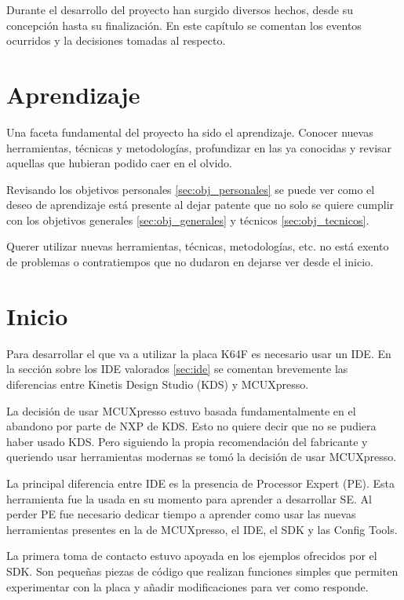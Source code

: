 {\label{ch:aspectos}}
Durante el desarrollo del proyecto han surgido diversos hechos, desde su
concepción hasta su finalización. En este capítulo se comentan los eventos
ocurridos y la decisiones tomadas al respecto.

\section{Aprendizaje}{\label{sec:aprendizaje}}
Una faceta fundamental del proyecto ha sido el aprendizaje. Conocer nuevas 
herramientas, técnicas y metodologías, profundizar en las ya conocidas y revisar
aquellas que hubieran podido caer en el olvido.

Revisando los objetivos personales \ref{sec:obj_personales} se puede ver como
el deseo de aprendizaje está presente al dejar patente que no solo se quiere
cumplir con los objetivos generales \ref{sec:obj_generales} y técnicos 
\ref{sec:obj_tecnicos}.

Querer utilizar nuevas herramientas, técnicas, metodologías, etc. no está exento
de problemas o contratiempos que no dudaron en dejarse ver desde el inicio.

\section{Inicio}{\label{sec:inicio}}
Para desarrollar el  que va a utilizar la placa K64F
es necesario usar un IDE. En la sección sobre los IDE valorados \ref{sec:ide}
se comentan brevemente las diferencias entre Kinetis Design Studio (KDS) y
MCUXpresso.

La decisión de usar MCUXpresso estuvo basada fundamentalmente en el abandono
por parte de NXP de KDS. Esto no quiere decir que no se pudiera haber usado KDS.
Pero siguiendo la propia recomendación del fabricante y queriendo usar
herramientas modernas se tomó la decisión de usar MCUXpresso.

La principal diferencia entre IDE es la presencia de Processor Expert (PE).
Esta herramienta fue la usada en su momento para aprender a desarrollar SE.
Al perder PE fue necesario dedicar tiempo a aprender como usar las nuevas
herramientas presentes en la  de MCUXpresso, el IDE, el
SDK y las Config Tools.

La primera toma de contacto estuvo apoyada en los ejemplos ofrecidos por el SDK.
Son pequeñas piezas de código que realizan funciones simples que permiten
experimentar con la placa y añadir modificaciones para ver como responde.

